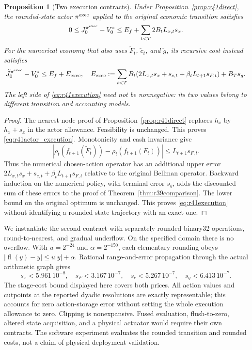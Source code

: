 \documentclass[ecta,nameyear,draft]{econsocart}
\newtheorem{proposition}[theorem]{Proposition}
\theoremstyle{definition}
\theoremstyle{remark}
\begin{document}
\begin{proposition}[Two execution contracts]
\label{prop:r41deployment}
Under Proposition~\ref{prop:r41direct}, the rounded-state actor
$\pi^{\rm exec}$ applied to the original economic transition satisfies
\begin{equation}
 0\leq J_0^{\pi^{\rm exec}}-V_0^*
       \leq E_f+\sum_{t<T}2B_tL_{x,t}s_x.
 \label{eq:r41actor_execution}
\end{equation}
For the numerical economy that also uses $\widetilde F_t$,
$\widetilde c_t$, and $\widetilde g$, its recursive cost instead satisfies
\begin{equation}
 \widetilde J_0^{\pi^{\rm exec}}-V_0^*
 \leq E_f+E_{\rm exec},\quad
 E_{\rm exec}:=\sum_{t<T}B_t
 (2L_{x,t}s_x+s_{c,t}+\beta_tL_{t+1}s_{F,t})+B_Ts_g.
 \label{eq:r41execution}
\end{equation}
The left side of \eqref{eq:r41execution} need not be nonnegative: its two
values belong to different transition and accounting models.
\end{proposition}
\begin{proof}
The nearest-node proof of Proposition~\ref{prop:r41direct} replaces $h_x$
by $h_x+s_x$ in the actor allowance. Feasibility is unchanged. This proves
\eqref{eq:r41actor_execution}. Monotonicity and cash invariance give
\[
 |\rho_t(f_{t+1}(\widetilde F_t))-
   \rho_t(f_{t+1}(F_t))|\leq L_{t+1}s_{F,t}.
\]
Thus the numerical chosen-action operator has an additional upper error
$2L_{x,t}s_x+s_{c,t}+\beta_tL_{t+1}s_{F,t}$ relative to the original Bellman
operator. Backward induction on the numerical policy, with terminal error
$s_g$, adds the discounted sum of these errors to the proof of
Theorem~\ref{thm:r39comparison}. The lower bound on the original optimum is
unchanged. This proves \eqref{eq:r41execution} without identifying a rounded
state trajectory with an exact one.
\end{proof}

We instantiate the second contract with separately rounded binary32
operations, round-to-nearest, and gradual underflow. On the specified domain
there is no overflow. With $u=2^{-24}$ and $\alpha=2^{-150}$, each elementary
rounding obeys $|\operatorname{fl}(y)-y|\leq u|y|+\alpha$. Rational
range-and-error propagation through the actual arithmetic graph gives
\[
 s_x<5.961\,10^{-8},\quad s_F<3.167\,10^{-7},\quad
 s_c<5.267\,10^{-7},\quad s_g<6.413\,10^{-7}.
\]
The stage-cost bound displayed here covers both prices. All action values
and cutpoints at the reported dyadic resolutions are exactly representable;
this accounts for zero action-storage error without setting the whole
execution allowance to zero. Clipping is nonexpansive. Fused evaluation,
flush-to-zero, altered state acquisition, and a physical actuator would
require their own contracts. The software experiment evaluates the rounded
transition and rounded costs, not a claim of physical deployment validation.
\end{document}
